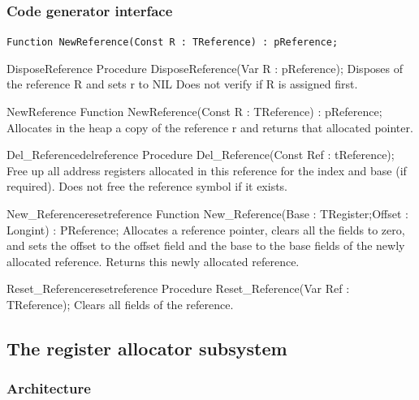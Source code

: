 \documentclass [a4paper,12pt]{article}
\begin{document}
\subsubsection{Code generator interface}
\label{subsubsec:mylabel28}

\lstinline!Function NewReference(Const R : TReference) : pReference;!

\begin{procedure}{DisposeReference}
\Declaration
Procedure DisposeReference(Var R : pReference);
\Description
Disposes of the reference \textsf{R} and sets r to \textsf{NIL}
\Notes
Does not verify if \textsf{R} is assigned first.
\end{procedure}

\begin{function}{NewReference}
\Declaration
Function NewReference(Const R : TReference) : pReference;
\Description
Allocates in the heap a copy of the reference \textsf{r} and returns that
allocated pointer.
\end{function}

\begin{functionl}{Del{\_}Reference}{delreference}
\Declaration
Procedure Del{\_}Reference(Const Ref : tReference);
\Description
Free up all address registers allocated in this reference for the index and
base (if required).
\Notes
Does not free the reference symbol if it exists.
\end{functionl}

\begin{functionl}{New{\_}Reference}{resetreference}
\Declaration
Function New{\_}Reference(Base : TRegister;Offset : Longint) : PReference;
\Description
Allocates a reference pointer, clears all the fields to zero, and sets the
offset to the offset field and the base to the base fields of the newly
allocated reference. Returns this newly allocated reference.
\end{functionl}

\begin{procedurel}{Reset{\_}Reference}{resetreference}
\Declaration
Procedure Reset{\_}Reference(Var Ref : TReference);
\Description
Clears all fields of the reference.
\end{procedurel}

\subsection{The register allocator subsystem}
\label{subsec:mylabel7}

\subsubsection{Architecture}
\label{subsubsec:architecture}
\end{document}
